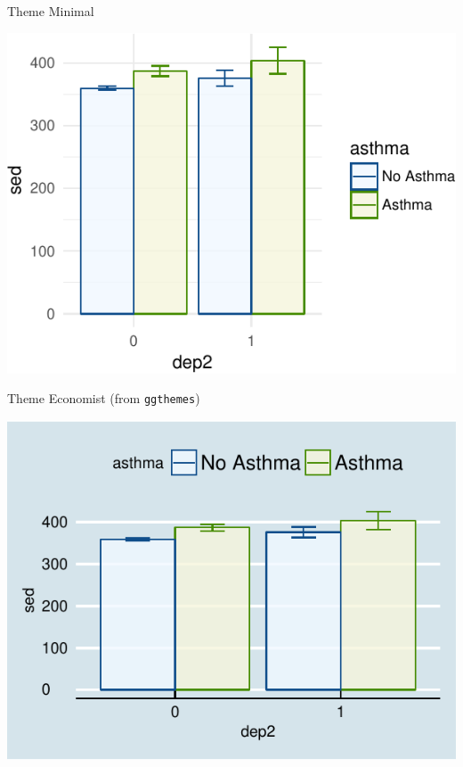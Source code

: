\begin{frame}[fragile]{Theme Minimal}

\begin{Shaded}
\begin{Highlighting}[]
\OperatorTok{+}\StringTok{ }
\StringTok{  }\NormalTok{()}
\end{Highlighting}
\end{Shaded}

\includegraphics{09_AdvancedPlotting_files/figure-beamer/unnamed-chunk-8-1.pdf}

\end{frame}

\begin{frame}[fragile]{Theme Economist (from \texttt{ggthemes})}

\begin{Shaded}
\begin{Highlighting}[]
\OperatorTok{+}\StringTok{ }
\StringTok{  }\NormalTok{()}
\end{Highlighting}
\end{Shaded}

\includegraphics{09_AdvancedPlotting_files/figure-beamer/unnamed-chunk-9-1.pdf}

\end{frame}


